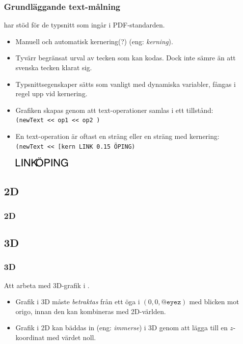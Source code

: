 \documentclass[noamsthm,handout]{beamer}
\newcommand{\inEnglish}[1]{(eng: \emph{#1})}
\begin{document}
\begin{frame}\frametitle{Grundläggande text-målning}
  \Shapes har stöd för de typsnitt som ingår i PDF-standarden.
  \begin{itemize}
  \item Manuell och automatisk kernering(?) \inEnglish{kerning}.
  \item Tyvärr begränsat urval av tecken som kan kodas.  Dock inte sämre än att svenska tecken klarat sig.
  \item Typsnittsegenskaper sätts som vanligt med dynamiska variabler, fångas i regel upp vid kernering.
  \item Grafiken skapas genom att text-operationer samlas i ett tillstånd:\\
    \texttt{({\color{red}newText} <{}< op1 <{}< op2 )}
  \item En text-operation är oftast en sträng eller en sträng med kernering:\\
    \texttt{({\color{red}newText} <{}< [kern \textasciigrave{}LINK\textasciiacute{} 0.15 \textasciigrave{}ÖPING\textasciiacute{})}\\
    \begin{center}
      \includegraphics{figures/linkoping}
    \end{center}
  \end{itemize}
\end{frame}
\subsection{2D}
\begin{frame}\frametitle{2D}

\end{frame}
\subsection{3D}
\begin{frame}\frametitle{3D}
  Att arbeta med 3D-grafik i \Shapes.
  \begin{itemize}
  \item Grafik i 3D måste \emph{betraktas} från ett öga i $(0,0,\texttt{@eyez})$ med blicken mot origo, innan den kan kombineras med 2D-världen.
  \item Grafik i 2D kan bäddas in \inEnglish{immerse} i 3D genom att lägga till en $z$-koordinat med värdet noll.
  \end{itemize}
\end{frame}
\end{document}
